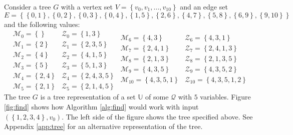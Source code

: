 Consider a tree $G$ with a vertex set $V = \left\{{v_0,v_1,\ldots,v_{10}}\right\}$
and an edge set $E = \left\{{\left\{{0,1}\right\},\left\{{0,2}\right\},\left\{{0,3}\right\},\left\{{0,4}\right\},\left\{{1,5}\right\},\left\{{2,6}\right\},\left\{{4,7}\right\},\left\{{5,8}\right\},\left\{{6,9}\right\},\left\{{9,10}\right\}}\right\}$
and the following values:
\[
    \begin{array}{ll}
        \mathcal{M}_0 = \left\{{}\right\}           & \mathcal{Z}_0 = \left\{{1,3}\right\} \\
        \mathcal{M}_1 = \left\{{2}\right\}          & \mathcal{Z}_1 = \left\{{2,3,5}\right\} \\
        \mathcal{M}_2 = \left\{{4}\right\}          & \mathcal{Z}_2 = \left\{{4,1,5}\right\} \\
        \mathcal{M}_3 = \left\{{5}\right\}          & \mathcal{Z}_3 = \left\{{5,1,3}\right\} \\
        \mathcal{M}_4 = \left\{{2,4}\right\}        & \mathcal{Z}_4 = \left\{{2,4,3,5}\right\} \\
        \mathcal{M}_5 = \left\{{2,1}\right\}        & \mathcal{Z}_5 = \left\{{2,1,4,5}\right\}
    \end{array}
    \begin{array}{ll}
        \mathcal{M}_6 = \left\{{4,3}\right\}        & \mathcal{Z}_6 = \left\{{4,3,1}\right\} \\
        \mathcal{M}_7 = \left\{{2,4,1}\right\}      & \mathcal{Z}_7 = \left\{{2,4,1,3}\right\} \\
        \mathcal{M}_8 = \left\{{2,1,3}\right\}      & \mathcal{Z}_8 = \left\{{2,1,3,5}\right\} \\
        \mathcal{M}_9 = \left\{{4,3,5}\right\}      & \mathcal{Z}_9 = \left\{{4,3,5,2}\right\} \\
        \mathcal{M}_{10} = \left\{{4,3,5,1}\right\} & \mathcal{Z}_{10} = \left\{{4,3,5,1,2}\right\} \\
    \end{array}
\]
The tree $G$ is a tree representation of a set $\mathbb{U}$ of some
$\mathcal{Q}$ with $5$ variables.
Figure \ref{fig:find} shows how Algorithm \ref{alg:find} would work with input
$(\left\{{1,2,3,4}\right\}, v_0)$. The left side of the figure shows the tree
specified above. See Appendix \ref{app:tree} for an alternative representation
of the tree.

